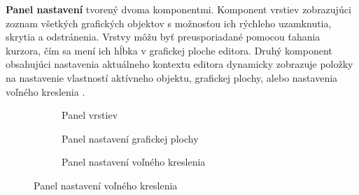 \newpage
	
\textbf{Panel nastavení} tvorený dvoma komponentmi. Komponent vrstiev zobrazujúci zoznam všetkých grafických objektov s možnosťou ich rýchleho uzamknutia, skrytia a odstránenia. Vrstvy môžu byť preusporiadané pomocou ťahania kurzora, čím sa mení ich hĺbka v grafickej ploche editora. Druhý komponent obsahujúci nastavenia aktuálneho kontextu editora dynamicky zobrazuje položky na nastavenie vlastností aktívneho objektu, grafickej plochy, alebo nastavenia voľného kreslenia .
\begin{figure}[H]
	\centering
	\begin{subfigure}[t]{0.3\linewidth}	
		\caption{Panel vrstiev }
		\label{obr:props-layers}
	\end{subfigure}
	\quad
	\begin{subfigure}[t]{0.3\linewidth}	
		\caption{Panel nastavení grafickej plochy}
		\label{obr:props-canvas}
	\end{subfigure}
	\quad
	\begin{subfigure}[t]{0.3\linewidth}	
		\caption{Panel nastavení voľného kreslenia}

\end{subfigure}
\end{figure}
